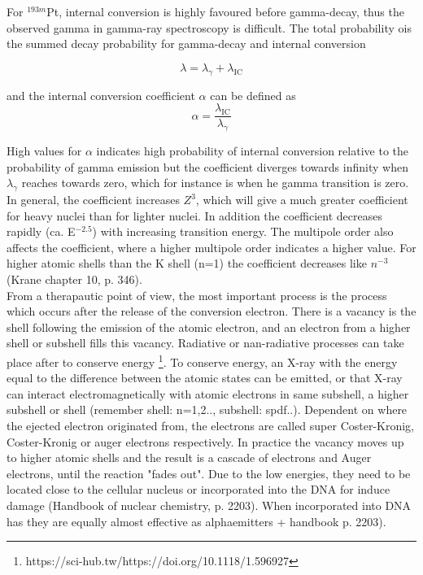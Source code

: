\noindent 
For $^{193m}$Pt, internal conversion is highly favoured before gamma-decay, thus the observed gamma in gamma-ray spectroscopy is difficult. The total probability ois the summed decay probability for gamma-decay and internal conversion 

\begin{equation}
    \lambda = \lambda_\gamma + \lambda_\text{IC}
\end{equation}

and the internal conversion coefficient $\alpha$ can be defined as 
\begin{equation}
    \alpha = \frac{\lambda_\text{IC}}{\lambda_\gamma}
\end{equation}

High values for $\alpha$ indicates high probability of internal conversion relative to the probability of gamma emission but the coefficient diverges towards infinity when $\lambda_\gamma$ reaches towards zero, which for instance is when he gamma transition is zero. In general, the coefficient increases $Z^3$, which will give a much greater coefficient for heavy nuclei than for lighter nuclei. In addition the coefficient decreases rapidly (ca. E$^{-2.5}$) with increasing transition energy. The multipole order also affects the coefficient, where a higher multipole order indicates a higher value. For higher atomic shells than the K shell (n=1) the coefficient decreases like $n^{-3}$ (Krane chapter 10, p. 346). \\

\noindent 
From a therapautic point of view, the most important process is the process which occurs after the release of the conversion electron. There is a vacancy is the shell following the emission of the atomic electron, and an electron from a higher shell or subshell fills  this vacancy. Radiative or nan-radiative processes can take place after to conserve energy \footnote{https://sci-hub.tw/https://doi.org/10.1118/1.596927}. To conserve energy, an X-ray with the energy equal to the difference between the atomic states can be emitted, or that X-ray can interact electromagnetically with atomic electrons in same subshell, a higher subshell or shell (remember shell: n=1,2.., subshell: spdf..). Dependent on where the ejected electron originated from, the electrons are called super Coster-Kronig, Coster-Kronig or auger electrons respectively. In practice the vacancy moves up to higher atomic shells and the result is a cascade of electrons and Auger electrons, until the reaction "fades out". Due to the low energies, they need to be located close to the cellular nucleus or incorporated into the DNA for induce damage (Handbook of nuclear chemistry, p. 2203). When incorporated into DNA has they are equally almost effective as alphaemitters \cite{Howell1991} + handbook p. 2203). 
\newpage


